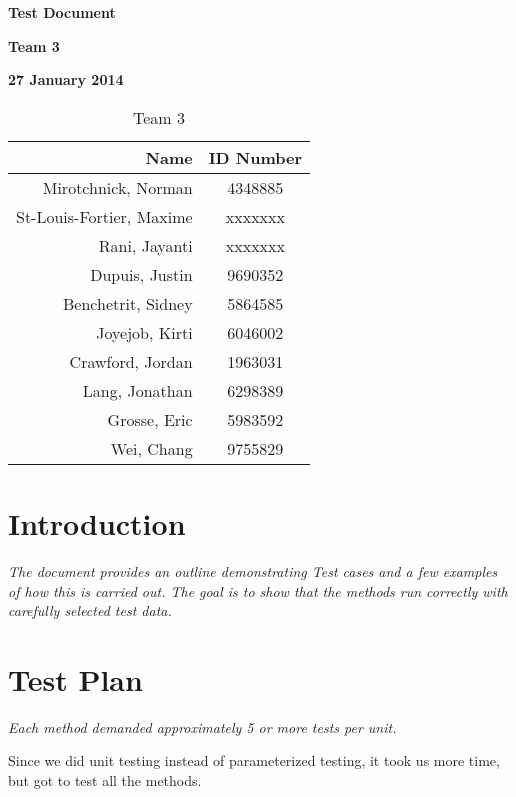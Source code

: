 \documentclass[12pt]{article}
\begin{document}
\vspace*{0.5in}
\centerline{\bf\Large Test Document}

\vspace*{0.5in}
\centerline{\bf\Large Team 3}

\vspace*{0.5in}
\centerline{\bf\Large 27 January 2014}

\vspace*{1.5in}
\begin{table}[htbp]
\caption{Team 3}
\begin{center}
\begin{tabular}{|r | c|}
\hline
Name & ID Number \\
\hline
Mirotchnick, Norman & 4348885 \\
\hline
St-Louis-Fortier, Maxime & xxxxxxx\\
\hline
Rani, Jayanti & xxxxxxx \\
\hline
Dupuis, Justin & 9690352\\
\hline
Benchetrit, Sidney & 5864585 \\
\hline
Joyejob, Kirti & 6046002 \\
\hline
Crawford, Jordan & 1963031 \\
\hline
Lang, Jonathan & 6298389 \\
\hline
Grosse, Eric & 5983592 \\
\hline
Wei, Chang & 9755829 \\
\hline
\end{tabular}
\end{center}
\end{table}

\clearpage

\section{Introduction}

{\it
The document provides an outline demonstrating Test cases and a few examples of how this is carried out. 
The goal is to show that the methods run correctly with carefully selected test data.
}

\section{Test Plan}

{\it
Each method demanded approximately 5 or more tests per unit.

Since we did unit testing instead of parameterized testing, it took us more time, but got to test all the methods.

}
\end{document}
